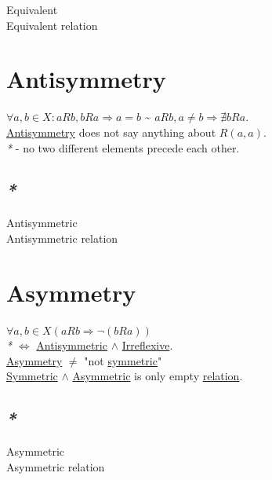 \documentclass[a4paper,14pt,oneside]{book}
\begin{document}
\label{orgd1723ac}Equivalent\\
\label{orgb744e4e}Equivalent relation\\

\section{\label{orgb0b3445}Antisymmetry}
\label{sec:org5319fae}

\(\forall a, b \in X : aRb, bRa \Rightarrow a = b\) \textasciitilde{} \(aRb, a \ne b \Rightarrow \nexists bRa\).\\
\hyperref[orgb0b3445]{Antisymmetry} does not say anything about \(R(a,a)\).\\

\emph{*} - no two different elements precede each other.\\

\subsection{\emph{*}}
\label{sec:org88d5df5}

\label{orgc699b09}Antisymmetric\\
\label{org9a6f0f2}Antisymmetric relation\\

\section{\label{org55b29dd}Asymmetry}
\label{sec:orgcee0923}

\(\forall a,b \in X (aRb \Rightarrow \neg (bRa))\)\\
\emph{*} \(\iff\) \hyperref[orgc699b09]{Antisymmetric} \(\land\) \hyperref[orgd1f1ef1]{Irreflexive}.\\
\hyperref[org55b29dd]{Asymmetry} \(\ne\) "not \hyperref[org23b3c7c]{symmetric}"\\
\hyperref[org23b3c7c]{Symmetric} \(\land\) \hyperref[org2846abc]{Asymmetric} is only empty \hyperref[org3bec6ce]{relation}.\\

\subsection{\emph{*}}
\label{sec:orge8ff5bf}

\label{org2846abc}Asymmetric\\
\label{org56a05d1}Asymmetric relation\\
\end{document}
